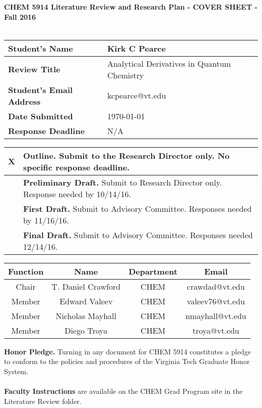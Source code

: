 
\begin{table}
\centering
{\bf CHEM 5914 Literature Review and Research Plan - COVER SHEET - Fall 2016} \\~\\
\renewcommand{\arraystretch}{1.5}
\begin{tabular}{|l|l|}
    \hline
    {\bf Student's Name} & Kirk C Pearce \\
    \hline
    {\bf Review Title} & Analytical Derivatives in Quantum Chemistry \\
    \hline
    {\bf Student's Email Address} & kcpearce@vt.edu \\
    \hline
    {\bf Date Submitted} & \today \\
    \hline
    {\bf Response Deadline} & N/A \\
    \hline
\end{tabular}

\vspace{10mm}

\begin{tabular}{|c|l|}
    \hline
    X & {\bf Outline.} Submit to the Research Director only. No specific response deadline. \\
    \hline
    & {\bf Preliminary Draft.} Submit to Research Director only. Response needed by 10/14/16. \\
    \hline
    & {\bf First Draft.} Submit to Advisory Committee. Responses needed by 11/16/16. \\
    \hline
    & {\bf Final Draft.} Submit to Advisory Committee. Responses needed 12/14/16. \\
    \hline
\end{tabular}

\vspace{10mm}

\begin{tabular}{|c|c|c|c|}
    \hline
    {\bf Function} & {\bf Name} & {\bf Department} & {\bf Email} \\
    \hline
    Chair & T. Daniel Crawford & CHEM & crawdad@vt.edu \\
    \hline
    Member & Edward Valeev & CHEM & valeev76@vt.edu \\
    \hline
    Member & Nicholas Mayhall & CHEM & nmayhall@vt.edu \\
    \hline
    Member & Diego Troya & CHEM & troya@vt.edu \\
    \hline
\end{tabular}
\end{table}
\begin{singlespacing}
\noindent
{\bf Honor Pledge.} Turning in any document for CHEM 5914 constitutes a pledge to conform to the policies and procedures of the Virginia Tech Graduate Honor System. \\~\\
{\bf Faculty Instructions} are available on the CHEM Grad Program site in the Literature Review folder.
\end{singlespacing}




